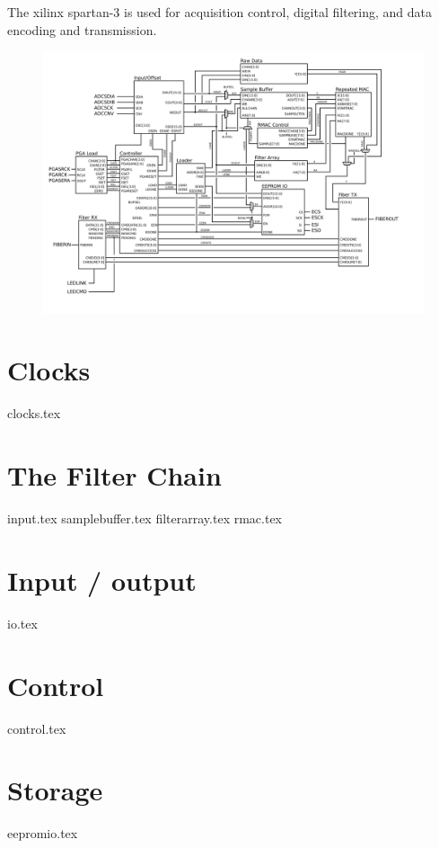 The xilinx spartan-3 is used for acquisition control, digital filtering, and data encoding and transmission. 

\begin{figure}[h!]
\includegraphics[scale=0.7]{FPGA.svg}
\end{figure}

\section{Clocks}
{clocks.tex}

\section{The Filter Chain}
{input.tex}
{samplebuffer.tex}
{filterarray.tex}
{rmac.tex}

\section{Input / output}

{io.tex}

\section{Control}
{control.tex}

\section{Storage}
{eepromio.tex}

